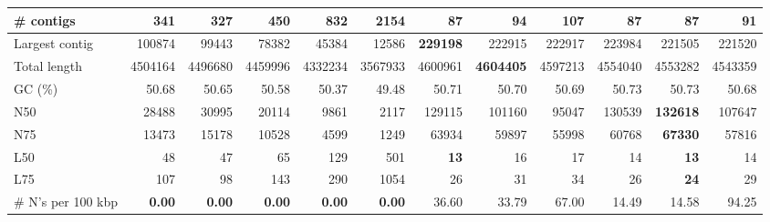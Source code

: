 \documentclass[12pt,a4paper]{article}
\begin{document}
\begin{table}[ht]
\begin{center}
\begin{tabular}{|l*{11}{|r}|}
\# contigs & 341 & 327 & 450 & 832 & 2154 & 87 & 94 & 107 & 87 & 87 & 91 \\ \hline
Largest contig & 100874 & 99443 & 78382 & 45384 & 12586 & {\bf 229198} & 222915 & 222917 & 223984 & 221505 & 221520 \\ \hline
Total length & 4504164 & 4496680 & 4459996 & 4332234 & 3567933 & 4600961 & {\bf 4604405} & 4597213 & 4554040 & 4553282 & 4543359 \\ \hline
GC (\%) & 50.68 & 50.65 & 50.58 & 50.37 & 49.48 & 50.71 & 50.70 & 50.69 & 50.73 & 50.73 & 50.68 \\ \hline
N50 & 28488 & 30995 & 20114 & 9861 & 2117 & 129115 & 101160 & 95047 & 130539 & {\bf 132618} & 107647 \\ \hline
N75 & 13473 & 15178 & 10528 & 4599 & 1249 & 63934 & 59897 & 55998 & 60768 & {\bf 67330} & 57816 \\ \hline
L50 & 48 & 47 & 65 & 129 & 501 & {\bf 13} & 16 & 17 & 14 & {\bf 13} & 14 \\ \hline
L75 & 107 & 98 & 143 & 290 & 1054 & 26 & 31 & 34 & 26 & {\bf 24} & 29 \\ \hline
\# N's per 100 kbp & {\bf 0.00} & {\bf 0.00} & {\bf 0.00} & {\bf 0.00} & {\bf 0.00} & 36.60 & 33.79 & 67.00 & 14.49 & 14.58 & 94.25 \\ \hline
\end{tabular}
\end{center}
\end{table}
\end{document}

